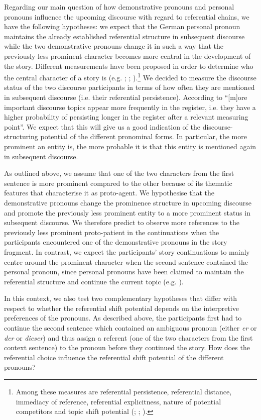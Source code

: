 \documentclass[output=paper,colorlinks,citecolor=brown]{langscibook}
\begin{document}
Regarding our main question of how demonstrative pronouns and personal pronouns influence the upcoming discourse with regard to referential chains, we have the following hypotheses: we expect that the German personal pronoun maintains the already established referential structure in subsequent discourse while the two demonstrative pronouns change it in such a way that the previously less prominent character becomes more central in the development of the story. Different measurements have been proposed in order to determine who the central character of a story is (e.g. \citealt{Givón1983}; \citealt{GarrodSanford1988}; \citealt{GernsbacherShroyer1989}).\footnote{Among these measures are referential persistence, referential distance, immediacy of reference, referential explicitness, nature of potential competitors and topic shift potential (\citealt{Givón1983}; \citealt{GarrodSanford1988}; \citealt{GernsbacherShroyer1989}).} We decided to measure the discourse status of the two discourse participants in terms of how often they are mentioned in subsequent discourse (i.e. their referential persistence). According to \citet[15]{Givón1983} “[m]ore important discourse topics appear more frequently in the register, i.e. they have a higher probability of persisting longer in the register after a relevant measuring point”. We expect that this will give us a good indication of the discourse-structuring potential of the different pronominal forms. In particular, the more prominent an entity is, the more probable it is that this entity is mentioned again in subsequent discourse. 

As outlined above, we assume that one of the two characters from the first sentence is more prominent compared to the other because of its thematic features that characterise it as proto-agent. We hypothesise that the demonstrative pronouns change the prominence structure in upcoming discourse and promote the previously less prominent entity to a more prominent status in subsequent discourse. We therefore predict to observe more references to the previously less prominent proto-patient in the continuations when the participants encountered one of the demonstrative pronouns in the story fragment. In contrast, we expect the participants’ story continuations to mainly centre around the prominent character when the second sentence contained the personal pronoun, since personal pronouns have been claimed to maintain the referential structure and continue the current topic (e.g. \citealt{Abraham2002}).  

In this context, we also test two complementary hypotheses that differ with respect to whether the referential shift potential depends on the interpretive preferences of the pronouns. As described above, the participants first had to continue the second sentence which contained an ambiguous pronoun (either \textit{er} or \textit{der} or \textit{dieser}) and thus assign a referent (one of the two characters from the first context sentence) to the pronoun before they continued the story. How does the referential choice influence the referential shift potential of the different pronouns? 
\end{document}
